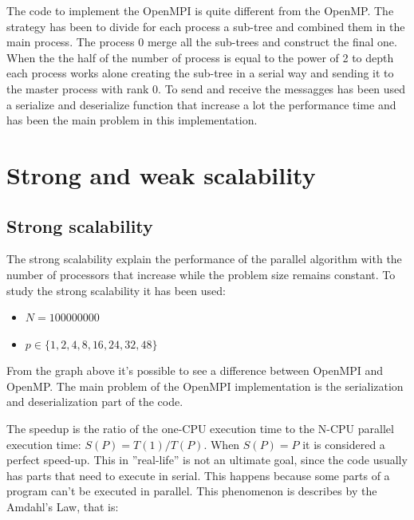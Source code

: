 \documentclass[11pt,a4paper]{article}
\begin{document}
The code to implement the OpenMPI is quite different from the OpenMP. The strategy has been to divide for each process a sub-tree and combined them in the main process. The process 0 merge all the sub-trees and construct the final one. When the the half of the number of process is equal to the power of 2 to depth each process works alone creating the sub-tree in a serial way and sending it to the master process with rank 0. To send and receive the messagges has been used a serialize and deserialize function that increase a lot the performance time and has been the main problem in this implementation. 
\section{Strong and weak scalability}
\subsection{Strong scalability}
The strong scalability explain the performance of the parallel algorithm with the number of processors that increase while the problem size remains constant. To study the strong scalability it has been used:
\begin{itemize}
\item $N = 100000000$ 
\item $p \in \{1, 2, 4, 8, 16, 24, 32, 48\}$ 
\end{itemize}
From the graph above it's possible to see a difference between OpenMPI and OpenMP. The main problem of the OpenMPI implementation is the serialization and deserialization part of the code.  
\begin{figure}[H]
    \centering
\end{figure}
The speedup is the ratio of the one-CPU execution time to the N-CPU parallel execution time: $S(P) = T(1)/T(P)$. When $S(P) = P$ it is considered a perfect speed-up. This in ”real-life” is not an ultimate goal, since the code usually has parts that need to execute in serial.  This happens because some parts of a program can’t be executed in parallel. This phenomenon is describes by the Amdahl’s Law, that is:
\end{document}
